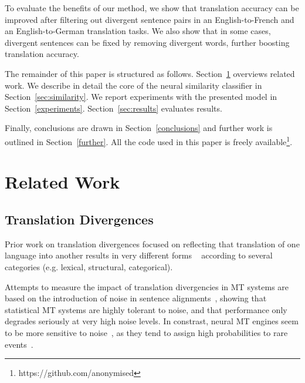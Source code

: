 \documentclass[11pt,a4paper]{article}
\begin{document}
To evaluate the benefits of our method, we show that translation accuracy can be improved after filtering out divergent sentence pairs in an English-to-French and an English-to-German translation tasks.
We also show that in some cases, divergent sentences can be fixed by removing divergent words, further boosting translation accuracy.

The remainder of this paper is structured as follows. 
Section~\ref{related} overviews related work. 
We describe in detail the core of the neural similarity classifier in Section~\ref{sec:similarity}. 
We report experiments with the presented model in Section~\ref{experiments}.
Section~\ref{sec:results} evaluates results. 

Finally, conclusions are drawn in Section~\ref{conclusions} and further work is outlined in Section~\ref{further}.
All the code used in this paper is freely available\footnote{https://github.com/anonymised}.

\section{Related Work}
\label{related}

\subsection{Translation Divergences}

Prior work on translation divergences focused on reflecting that translation of one language into another results in very different forms ~\cite{J94-4004} according to several categories (e.g. lexical, structural, categorical). 

Attempts to measure the impact of translation divergencies in MT
systems are based on the introduction of noise in sentence
alignments~\cite{goute2012}, showing that statistical MT systems are
highly tolerant to noise, and that performance only degrades seriously
at very high noise levels. In constrast, neural MT engines seem to be
more sensitive to noise~\cite{chen2016adaptation}, as they tend to assign high probabilities to rare events~\cite{Hassan2018AchievingHP}.
\end{document}
